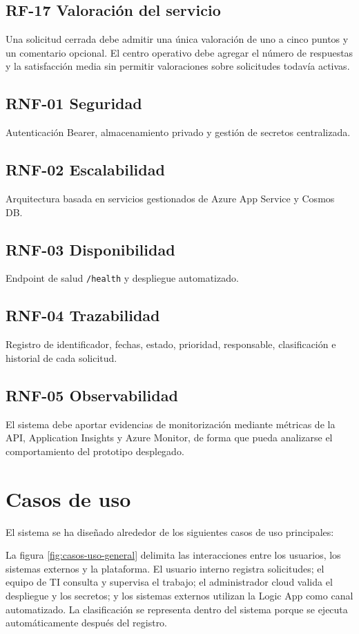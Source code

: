 \subsection{RF-17 Valoración del servicio}
Una solicitud cerrada debe admitir una única valoración de uno a cinco puntos y un comentario opcional. El centro operativo debe agregar el número de respuestas y la satisfacción media sin permitir valoraciones sobre solicitudes todavía activas.

\subsection{RNF-01 Seguridad}
Autenticación Bearer, almacenamiento privado y gestión de secretos centralizada.

\subsection{RNF-02 Escalabilidad}
Arquitectura basada en servicios gestionados de Azure App Service y Cosmos DB.

\subsection{RNF-03 Disponibilidad}
Endpoint de salud \texttt{/health} y despliegue automatizado.

\subsection{RNF-04 Trazabilidad}
Registro de identificador, fechas, estado, prioridad, responsable, clasificación e historial de cada solicitud.

\subsection{RNF-05 Observabilidad}
El sistema debe aportar evidencias de monitorización mediante métricas de la API, Application Insights y Azure Monitor, de forma que pueda analizarse el comportamiento del prototipo desplegado.

\section{Casos de uso}

El sistema se ha diseñado alrededor de los siguientes casos de uso principales:

La figura \ref{fig:casos-uso-general} delimita las interacciones entre los usuarios, los sistemas externos y la plataforma. El usuario interno registra solicitudes; el equipo de TI consulta y supervisa el trabajo; el administrador cloud valida el despliegue y los secretos; y los sistemas externos utilizan la Logic App como canal automatizado. La clasificación se representa dentro del sistema porque se ejecuta automáticamente después del registro.

